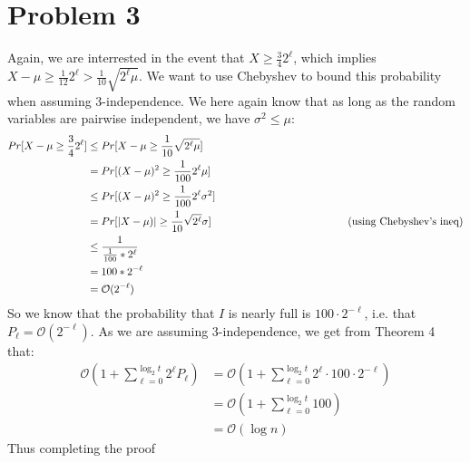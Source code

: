 \documentclass[a4paper, fleqn]{article}
\newcommand{\comment}[1]{%
  \text{\phantom{(#1)}} \tag{#1}}
\begin{document}
\section*{Problem 3}
Again, we are interrested in the event that $X \geq \frac{3}{4} 2^{\ell}$, which implies $X-\mu \geq \frac{1}{12} 2^{\ell}> \frac{1}{10} \sqrt{2^{\ell}\mu}$. We want to use Chebyshev to bound this probability when assuming 3-independence. We here again know that as long as the random variables are pairwise independent, we have $\sigma^2 \leq \mu$:
\begin{align*}
  Pr[X-\mu\geq \frac{3}{4} 2^{\ell}] & \leq Pr[X-\mu \geq \frac{1}{10} \sqrt{2^{\ell}\mu}]\\
                                     & =    Pr[(X-\mu)^2 \geq \frac{1}{100} 2^{\ell}\mu]\\
                                     & \leq Pr[(X-\mu)^2 \geq \frac{1}{100} 2^{\ell}\sigma^2]\\
                                     & =    Pr[|X-\mu)|  \geq \frac{1}{10} \sqrt{2^{\ell}}\sigma] \comment{using Chebyshev's ineq}\\
                                     & \leq \frac{1}{\frac{1}{100}*2^{\ell}}\\
                                     & =    100*2^{-\ell}\\
                                     & =    \mathcal{O}(2^{-\ell})
\end{align*}
So we know that the probability that $I$ is nearly full is $100\cdot2^{-\ell}$, i.e. that $P_{\ell} = \mathcal{O}(2^{-\ell})$. As we are assuming 3-independence, we get from Theorem 4 that:
\begin{align*}
  \mathcal{O}\left(1+\sum_{\ell=0}^{\log_2 t}2^{\ell}P_{\ell}\right) &= \mathcal{O}\left(1+\sum_{\ell=0}^{\log_2 t}2^{\ell}\cdot 100\cdot 2^{-\ell}\right)\\
                                                                     &= \mathcal{O}\left(1+\sum_{\ell=0}^{\log_2 t}100\right)\\
                                                                     &= \mathcal{O}(\log n)
\end{align*}
Thus completing the proof
\end{document}
